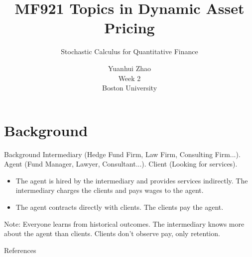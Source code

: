\documentclass{beamer}
\title{MF921 Topics in Dynamic Asset Pricing}
\author{Stochastic Calculus for Quantitative Finance}
\date{Yuanhui Zhao\\Week 2\\Boston University}
\begin{document}
\frame{\titlepage}

\section{Background}
\begin{frame}{Background}
Intermediary (Hedge Fund Firm, Law Firm, Consulting Firm...).  
Agent (Fund Manager, Lawyer, Consultant...).  
Client (Looking for services).

\vspace{2em}
\begin{itemize}
    \item The agent is hired by the intermediary and provides services indirectly. The intermediary charges the clients and pays wages to the agent.
    \vspace{1em}
    \item The agent contracts directly with clients. The clients pay the agent.
\end{itemize}

\vspace{1em}
Note: Everyone learns from historical outcomes. The intermediary knows more about the agent than clients. Clients don’t observe pay, only retention.
\end{frame}

\begin{frame}[allowframebreaks]{References}
\nocite{*} %
\printbibliography
\end{frame}
\end{document}
